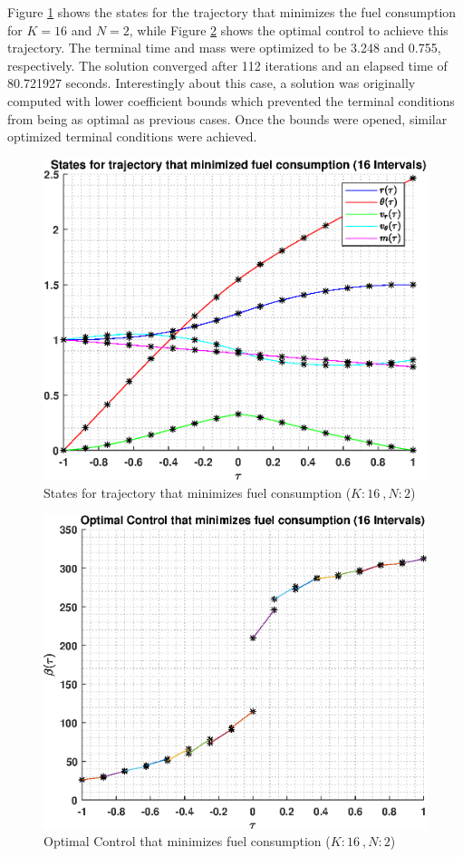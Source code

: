 \documentclass[]{article}
\begin{document}
Figure \ref{fig:directStatesK16Poly2} shows the states for the trajectory that minimizes the fuel consumption for \(K = 16\) and  \(N = 2\), while Figure \ref{fig:directControlK16Poly2} shows the optimal control to achieve this trajectory. The terminal time and mass were optimized to be 3.248 and 0.755, respectively. The solution converged after 112 iterations and an elapsed time of 80.721927 seconds. Interestingly about this case, a solution was originally computed with lower coefficient bounds which prevented the terminal conditions from being as optimal as previous cases. Once the bounds were opened, similar optimized terminal conditions were achieved.
\begin{figure}
	\centering
	\includegraphics[scale=0.75]{directStatesK16Poly2.eps}
	\caption{States for trajectory that minimizes fuel consumption (\(K:16\ , N:2\))}
	\label{fig:directStatesK16Poly2}
\end{figure}
\begin{figure}
	\centering
	\includegraphics[scale=0.75]{directControlK16Poly2.eps}
	\caption{Optimal Control that minimizes fuel consumption (\(K:16\ , N:2\))}
	\label{fig:directControlK16Poly2}
\end{figure}
\FloatBarrier
\end{document}
